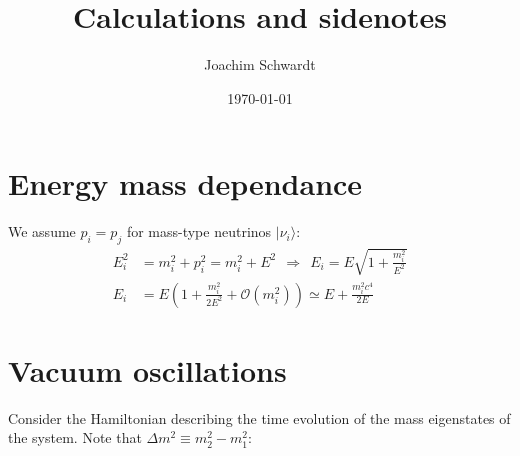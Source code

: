 \documentclass[a4paper,12pt]{article}
\begin{document}
\title{Calculations and sidenotes}
\author{Joachim Schwardt}
\date{\today}
\maketitle

\section{Energy mass dependance}
We assume $p_i=p_j$ for mass-type neutrinos $|\nu_i\rangle$:
\begin{align*}
E_i^2&=m_i^2+p_i^2=m_i^2+E^2\ \ \Rightarrow\ \ E_i=E\sqrt{1+\frac{m_i^2}{E^2}} \\
E_i&= E(1+\frac{m_i^2}{2E^2}+\mathcal{O}(m_i^2))\simeq E+\frac{m_i^2c^4}{2E}
\end{align*}
\section{Vacuum oscillations}
Consider the Hamiltonian describing the time evolution of the mass eigenstates of the system. Note that $\Delta m^2\equiv m_2^2-m_1^2$:
\end{document}
